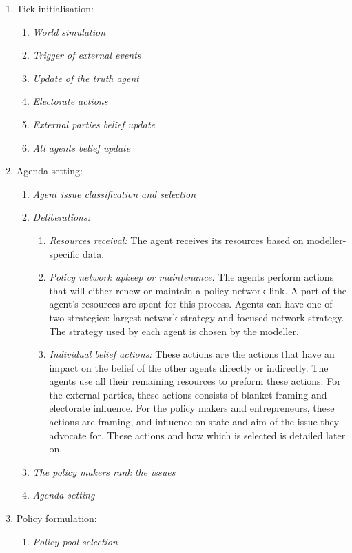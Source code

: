 \begin{enumerate}
\item Tick initialisation:
	\begin{enumerate}
	\item \emph{World simulation}
	\item \emph{Trigger of external events}
	\item \emph{Update of the truth agent}
	\item \emph{Electorate actions}
	\item \emph{External parties belief update}
	\item \emph{All agents belief update}
	\end{enumerate}
\item Agenda setting:
	\begin{enumerate}
	\item \emph{Agent issue classification and selection}
	\item \emph{Deliberations:}
		\begin{enumerate}
		\item \emph{Resources receival:} The agent receives its resources based on modeller-specific data.
		\item \emph{Policy network upkeep or maintenance:} The agents perform actions that will either renew or maintain a policy network link. A part of the agent's resources are spent for this process. Agents can have one of two strategies: largest network strategy and focused network strategy. The strategy used by each agent is chosen by the modeller.
		\item \emph{Individual belief actions:} These actions are the actions that have an impact on the belief of the other agents directly or indirectly. The agents use all their remaining resources to preform these actions. For the external parties, these actions consists of blanket framing and electorate influence. For the policy makers and entrepreneurs, these actions are framing, and influence on state and aim of the issue they advocate for. These actions and how which is selected is detailed later on.
		\end{enumerate}
	\item \emph{The policy makers rank the issues}
	\item \emph{Agenda setting}
	\end{enumerate}
\item Policy formulation:
	\begin{enumerate}
	\item \emph{Policy pool selection}

\end{enumerate}
\end{enumerate}
